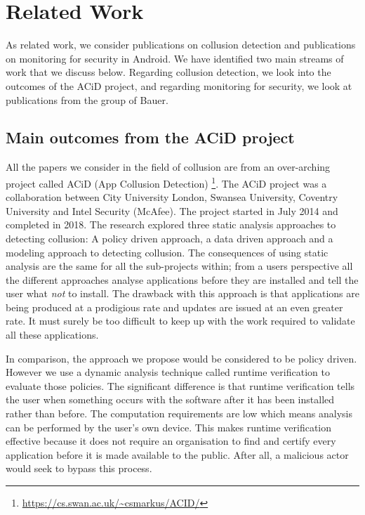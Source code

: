 \chapter{Related Work}
\label{chap:Related Work}

As related work, we consider publications on collusion detection and publications on monitoring for security in Android.  We have identified two main streams of work that we discuss below.  Regarding collusion detection, we look into the outcomes of the ACiD project, and regarding monitoring for security, we look at publications from the group of Bauer.

\section{Main outcomes from the ACiD project}

All the papers we consider in the field of collusion are from an over-arching project called ACiD (App Collusion Detection) \footnote{\url{https://cs.swan.ac.uk/~csmarkus/ACID/}}.  The ACiD project was a collaboration between City University London, Swansea University, Coventry University and Intel Security (McAfee). The project started in July 2014 and completed in 2018.  The research explored three static analysis approaches to detecting collusion:  A policy driven approach, a data driven approach and a modeling approach to detecting collusion.  The consequences of using static analysis are the same for all the sub-projects within; from a users perspective all the different approaches analyse applications before they are installed and tell the user what \textit{not} to install.  The drawback with this approach is that applications are being produced at a prodigious rate and updates are issued at an even greater rate.  It must surely be too difficult to keep up with the work required to validate all these applications.

In comparison, the approach we propose would be considered to be policy driven.  However we use a dynamic analysis technique called runtime verification to evaluate those policies.  The significant difference is that runtime verification tells the user when something occurs with the software after it has been installed rather than before.  The computation requirements are low which means analysis can be performed by the user's own device.  This makes runtime verification effective because it does not require an organisation to find and certify every application before it is made available to the public.  After all, a malicious actor would seek to bypass this process.

